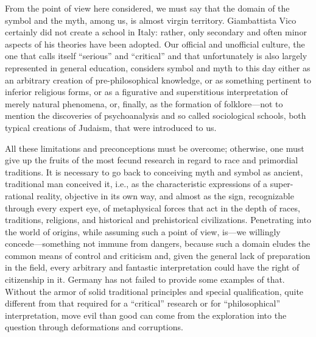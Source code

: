 From the point of view here considered, we must say that the domain of the symbol and the myth, among us, is almost virgin territory. Giambattista Vico certainly did not create a school in Italy: rather, only secondary and often minor aspects of his theories have been adopted. Our official and unofficial culture, the one that calls itself ``serious'' and ``critical'' and that unfortunately is also largely represented in general education, considers symbol and myth to this day either as an arbitrary creation of pre-philosophical knowledge, or as something pertinent to inferior religious forms, or as a figurative and superstitious interpretation of merely natural phenomena, or, finally, as the formation of folklore---not to mention the discoveries of psychoanalysis and so called sociological schools, both typical creations of Judaism, that were introduced to us.

All these limitations and preconceptions must be overcome; otherwise, one must give up the fruits of the most fecund research in regard to race and primordial traditions. It is necessary to go back to conceiving myth and symbol as ancient, traditional man conceived it, i.e., as the characteristic expressions of a super-rational reality, objective in its own way, and almost as the sign, recognizable through every expert eye, of metaphysical forces that act in the depth of races, traditions, religions, and historical and prehistorical civilizations. Penetrating into the world of origins, while assuming such a point of view, is---we willingly concede---something not immune from dangers, because such a domain eludes the common means of control and criticism and, given the general lack of preparation in the field, every arbitrary and fantastic interpretation could have the right of citizenship in it. Germany has not failed to provide some examples of that. Without the armor of solid traditional principles and special qualification, quite different from that required for a ``critical'' research or for ``philosophical'' interpretation, move evil than good can come from the exploration into the question through deformations and corruptions.

